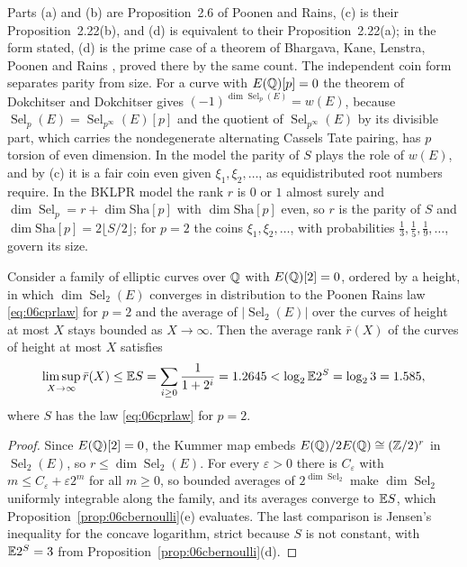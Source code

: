 Parts (a) and (b) are Proposition~2.6 of Poonen and Rains, (c) is their Proposition~2.22(b), and (d) is equivalent to their Proposition~2.22(a); in the form stated, (d) is the prime case of a theorem of Bhargava, Kane, Lenstra, Poonen and Rains \cite{bklpr2015}, proved there by the same count. The independent coin form separates parity from size. For a curve with $E(\mathbb{Q})[p] = 0$ the theorem of Dokchitser and Dokchitser gives $(-1)^{\dim\operatorname{Sel}_p(E)} = w(E)$, because $\operatorname{Sel}_p(E) = \operatorname{Sel}_{p^\infty}(E)[p]$ and the quotient of $\operatorname{Sel}_{p^\infty}(E)$ by its divisible part, which carries the nondegenerate alternating Cassels Tate pairing, has $p$ torsion of even dimension. In the model the parity of $S$ plays the role of $w(E)$, and by (c) it is a fair coin even given $\xi_1,\xi_2,\dots$, as equidistributed root numbers require. In the BKLPR model the rank $r$ is $0$ or $1$ almost surely and $\dim\operatorname{Sel}_p = r+\dim\mathrm{Sha}[p]$ with $\dim\mathrm{Sha}[p]$ even, so $r$ is the parity of $S$ and $\dim\mathrm{Sha}[p] = 2\lfloor S/2\rfloor$; for $p = 2$ the coins $\xi_1,\xi_2,\dots$, with probabilities $\frac13,\frac15,\frac19,\dots$, govern its size.

\begin{corollary}\label{cor:06cbound}
Consider a family of elliptic curves over $\mathbb{Q}$ with $E(\mathbb{Q})[2] = 0$, ordered by a height, in which $\dim\operatorname{Sel}_2(E)$ converges in distribution to the Poonen Rains law \eqref{eq:06cprlaw} for $p = 2$ and the average of $|\operatorname{Sel}_2(E)|$ over the curves of height at most $X$ stays bounded as $X\to\infty$. Then the average rank $\bar r(X)$ of the curves of height at most $X$ satisfies
\[
\limsup_{X\to\infty}\bar r(X)\le\mathbb{E} S = \sum_{i\ge0}\frac{1}{1+2^i} = 1.2645 < \log_2\mathbb{E}2^S = \log_23 = 1.585 ,
\]
where $S$ has the law \eqref{eq:06cprlaw} for $p = 2$.
\end{corollary}

\begin{proof}
Since $E(\mathbb{Q})[2] = 0$, the Kummer map embeds $E(\mathbb{Q})/2E(\mathbb{Q})\cong(\mathbb{Z}/2)^r$ in $\operatorname{Sel}_2(E)$, so $r\le\dim\operatorname{Sel}_2(E)$. For every $\varepsilon>0$ there is $C_\varepsilon$ with $m\le C_\varepsilon+\varepsilon2^m$ for all $m\ge0$, so bounded averages of $2^{\dim\operatorname{Sel}_2}$ make $\dim\operatorname{Sel}_2$ uniformly integrable along the family, and its averages converge to $\mathbb{E} S$, which Proposition~\ref{prop:06cbernoulli}(e) evaluates. The last comparison is Jensen's inequality for the concave logarithm, strict because $S$ is not constant, with $\mathbb{E}2^S = 3$ from Proposition~\ref{prop:06cbernoulli}(d).
\end{proof}


